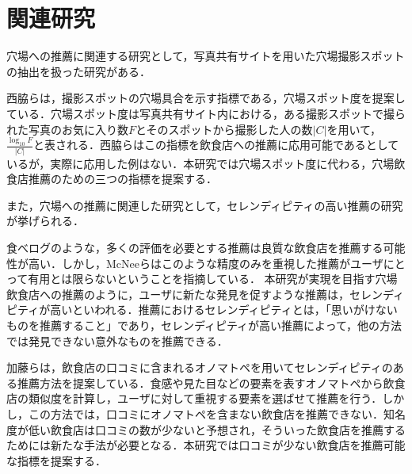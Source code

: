 \chapter{関連研究}

穴場への推薦に関連する研究として，写真共有サイトを用いた穴場撮影スポットの抽出を扱った研究がある．\par
西脇ら\cite{picture}は，撮影スポットの穴場具合を示す指標である，穴場スポット度を提案している．穴場スポット度は写真共有サイト内における，ある撮影スポットで撮られた写真のお気に入り数$F$とそのスポットから撮影した人の数$|C|$を用いて，$\frac{\log_{10}F}{|C|}$と表される．西脇らはこの指標を飲食店への推薦に応用可能であるとしているが，実際に応用した例はない．本研究では穴場スポット度に代わる，穴場飲食店推薦のための三つの指標を提案する．\par
また，穴場への推薦に関連した研究として，セレンディピティの高い推薦の研究が挙げられる．\par
食べログのような，多くの評価を必要とする推薦は良質な飲食店を推薦する可能性が高い．しかし，McNeeら\cite{McNee}はこのような精度のみを重視した推薦がユーザにとって有用とは限らないということを指摘している．
本研究が実現を目指す穴場飲食店への推薦のように，ユーザに新たな発見を促すような推薦は，セレンディピティが高いといわれる．推薦におけるセレンディピティとは，「思いがけないものを推薦すること」であり\cite{McNee}，セレンディピティが高い推薦によって，他の方法では発見できない意外なものを推薦できる\cite{Parameswaran}．\par
加藤ら\cite{onomatopoeia}は，飲食店の口コミに含まれるオノマトペを用いてセレンディピティのある推薦方法を提案している．食感や見た目などの要素を表すオノマトペから飲食店の類似度を計算し，ユーザに対して重視する要素を選ばせて推薦を行う．しかし，この方法では，口コミにオノマトペを含まない飲食店を推薦できない．知名度が低い飲食店は口コミの数が少ないと予想され，そういった飲食店を推薦するためには新たな手法が必要となる．本研究では口コミが少ない飲食店を推薦可能な指標を提案する．
